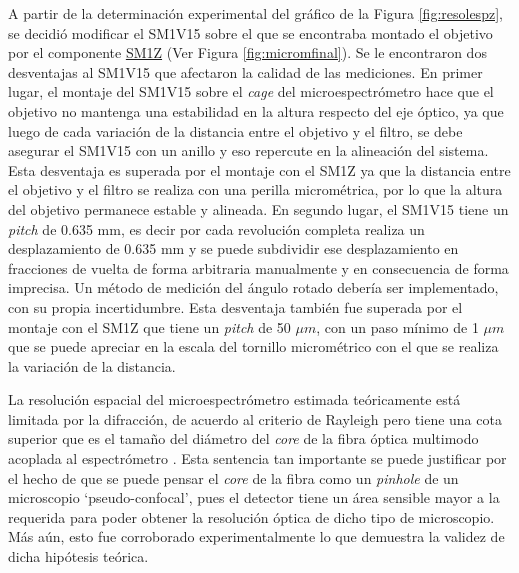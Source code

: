 A partir de la determinación experimental del gráfico de la Figura \ref{fig:resolespz}, se decidió modificar el SM1V15 sobre el que se encontraba montado el objetivo por el componente \href{https://www.thorlabs.com/thorProduct.cfm?partNumber=SM1Z#ad-image-0}{SM1Z} (Ver Figura \ref{fig:micromfinal}). Se le encontraron dos desventajas al SM1V15 que afectaron la calidad de las mediciones. En primer lugar, el montaje del SM1V15 sobre el \textit{cage} del microespectrómetro hace que el objetivo no mantenga una estabilidad en la altura respecto del eje óptico, ya que luego de cada variación de la distancia entre el objetivo y el filtro, se debe asegurar el SM1V15 con un anillo y eso repercute en la alineación del sistema. Esta desventaja es superada por el montaje con el SM1Z ya que la distancia entre el objetivo y el filtro se realiza con una perilla micrométrica, por lo que la altura del objetivo permanece estable y alineada. En segundo lugar, el SM1V15 tiene un \textit{pitch} de 0.635 mm, es decir por cada revolución completa realiza un desplazamiento de 0.635 mm y se puede subdividir ese desplazamiento en fracciones de vuelta de forma arbitraria manualmente y en consecuencia de forma imprecisa. Un método de medición del ángulo rotado debería ser implementado, con su propia incertidumbre. Esta desventaja también fue superada por el montaje con el SM1Z que tiene un \textit{pitch} de 50 $\mu m$, con un paso mínimo de 1 $\mu m$ que se puede apreciar en la escala del tornillo micrométrico con el que se realiza la variación de la distancia. 

La resolución espacial del microespectrómetro estimada teóricamente está limitada por la difracción, de acuerdo al criterio de Rayleigh pero tiene una cota superior que es el tamaño del diámetro del \textit{core} de la fibra óptica multimodo acoplada al espectrómetro \cite{turrell}. Esta sentencia tan importante se puede justificar por el hecho de que se puede pensar el \textit{core} de la fibra como un \textit{pinhole} de un microscopio `pseudo-confocal', pues el detector tiene un área sensible mayor a la requerida para poder obtener la resolución óptica de dicho tipo de microscopio. Más aún, esto fue corroborado experimentalmente lo que demuestra la validez de dicha hipótesis teórica.

